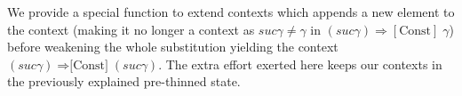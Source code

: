 We provide a special function to extend contexts which appends a new
element to the context (making it no longer a context as $suc γ \neq γ$ in
$(suc γ) ⇒[ \mbox{Const} ]\; γ$) before weakening the whole substitution
yielding the context $(suc γ)\; \mbox{⇒[Const]} \;(suc γ)$. The extra effort
exerted here keeps our contexts in the previously explained pre-thinned state.

